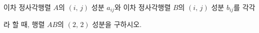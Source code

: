 \hspace*{2mm}\begin{minipage}[t]{\dimexpr\linewidth-2mm\relax}\vspace{0pt}
이차 정사각행렬 $A$의 $(i,\,j)$ 성분 $a_{ij}$와 이차 정사각행렬 $B$의 $(i,\,j)$ 성분 $b_{ij}$를 각각 \par\smallskip{}\par\smallskip\noindent 라 할 때, 행렬 $AB$의 $(2,\,2)$ 성분을 구하시오.\end{minipage}
